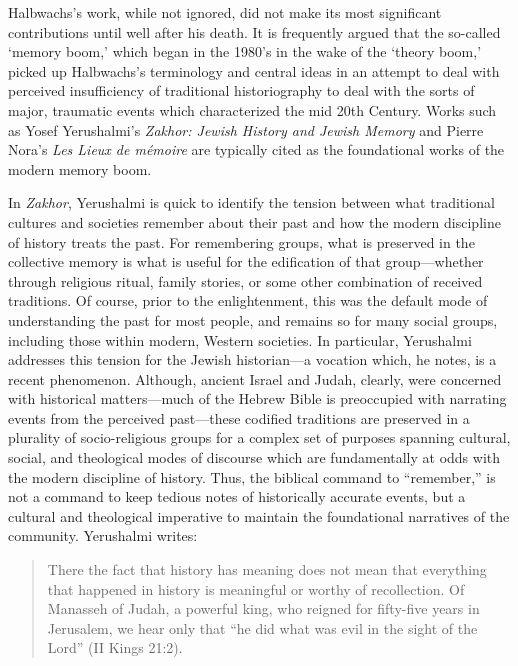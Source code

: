 Halbwachs's work, while not ignored, did not make its most significant
contributions until well after his death. It is frequently argued that
the so-called `memory boom,' which began in the 1980's in the wake of
the `theory boom,' picked up Halbwachs's terminology and central ideas
in an attempt to deal with perceived insufficiency of traditional
historiography to deal with the sorts of major, traumatic events which
characterized the mid 20th
Century.\autocites[1--2]{galinsky_galinsky2016}[See also][29--36. One
cannot help but speculate that---at least in the English-speaking
world---the translation of \emph{The Collective Memory} in 1980
contributed to the popularity of Halbwachs's
terminology.]{olick_olick-etal2011} Works such as Yosef Yerushalmi's
\emph{Zakhor: Jewish History and Jewish Memory} and Pierre Nora's
\emph{Les Lieux de mémoire} are typically cited as the foundational
works of the modern memory
boom.\autocites[112--113]{klein2011}{yerushalmi1989}[Nora's massive
project has been abridged and translated into English as][]{nora1996}

In \emph{Zakhor}, Yerushalmi is quick to identify the tension between
what traditional cultures and societies remember about their past and
how the modern discipline of history treats the past. For remembering
groups, what is preserved in the collective memory is what is useful for
the edification of that group---whether through religious ritual, family
stories, or some other combination of received traditions. Of course,
prior to the enlightenment, this was the default mode of understanding
the past for most people, and remains so for many social groups,
including those within modern, Western societies. In particular,
Yerushalmi addresses this tension for the Jewish historian---a vocation
which, he notes, is a recent phenomenon. Although, ancient Israel and
Judah, clearly, were concerned with historical matters---much of the
Hebrew Bible is preoccupied with narrating events from the perceived
past---these codified traditions are preserved in a plurality of
socio-religious groups for a complex set of purposes spanning cultural,
social, and theological modes of discourse which are fundamentally at
odds with the modern discipline of history. Thus, the biblical command
to ``remember,'' is not a command to keep tedious notes of historically
accurate events, but a cultural and theological imperative to maintain
the foundational narratives of the community. Yerushalmi writes:

\begin{quote}
There the fact that history has meaning does not mean that everything
that happened in history is meaningful or worthy of recollection. Of
Manasseh of Judah, a powerful king, who reigned for fifty-five years in
Jerusalem, we hear only that ``he did what was evil in the sight of the
Lord'' (II Kings 21:2).\autocite[10]{yerushalmi1989}
\end{quote}

